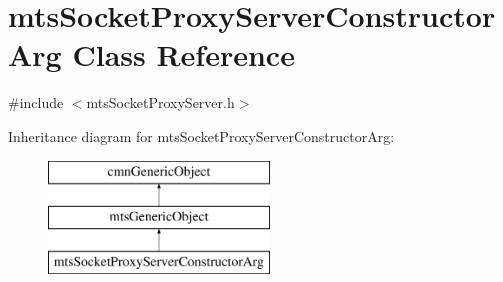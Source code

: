 \hypertarget{classmts_socket_proxy_server_constructor_arg}{}\section{mts\+Socket\+Proxy\+Server\+Constructor\+Arg Class Reference}
\label{classmts_socket_proxy_server_constructor_arg}


{\ttfamily \#include $<$mts\+Socket\+Proxy\+Server.\+h$>$}

Inheritance diagram for mts\+Socket\+Proxy\+Server\+Constructor\+Arg\+:\begin{figure}[H]
\begin{center}
\leavevmode
\includegraphics[height=3.000000cm]{d6/d47/classmts_socket_proxy_server_constructor_arg}
\end{center}
\end{figure}
